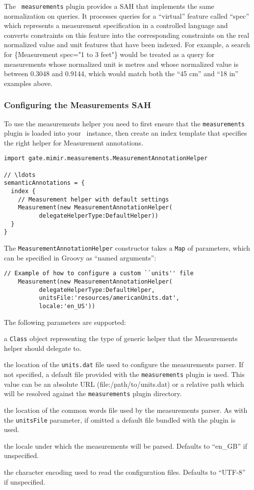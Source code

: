 The \Mimir\ {\tt measurements} plugin provides a SAH that implements the same
normalization on queries.  It processes queries for a ``virtual'' feature
called ``spec'' which represents a measurement specification in a controlled
language and converts constraints on this feature into the corresponding
constraints on the real normalized value and unit features that have been
indexed.  For example, a search for \{Measurement spec="1 to 3 feet"\} would be
treated as a query for measurements whose normalized unit is metres and whose
normalized value is between 0.3048 and 0.9144, which would match both the ``45
cm'' and ``18 in'' examples above.

\subsubsection{Configuring the Measurements SAH}

To use the measurements helper you need to first ensure that the
{\tt measurements} plugin is loaded into your \Mimir\ instance, then create an
index template that specifies the right helper for Measurement annotations.
\begin{lstlisting}[texcl]
import gate.mimir.measurements.MeasurementAnnotationHelper

// \ldots
semanticAnnotations = {
  index {
    // Measurement helper with default settings
    Measurement(new MeasurementAnnotationHelper(
          delegateHelperType:DefaultHelper))
  }
}
\end{lstlisting}

The {\tt MeasurementAnnotationHelper} constructor takes a {\tt Map} of
parameters, which can be specified in Groovy as ``named arguments'':
\begin{lstlisting}[firstnumber=6,texcl]
    // Example of how to configure a custom ``units'' file
    Measurement(new MeasurementAnnotationHelper(
          delegateHelperType:DefaultHelper,
          unitsFile:'resources/americanUnits.dat',
          locale:'en_US'))
\end{lstlisting}

The following parameters are supported:
\bde
\item[delegateHelperType (required)] a {\tt Class} object representing the type
of generic helper that the Measurements helper should delegate to.
\item[unitsFile] the location of the {\tt units.dat} file used to configure the
  measurements parser.  If not specified, a default file provided with the
  {\tt measurements} plugin is used.  This value can be an absolute URL
  (file:/path/to/units.dat) or a relative path which will be resolved against
  the {\tt measurements} plugin directory.
\item[commonWords] the location of the common words file used by the
  measurements parser.  As with the {\tt unitsFile} parameter, if omitted a
  default file bundled with the plugin is used.
\item[locale] the locale under which the measurements will be parsed.  Defaults
  to ``en\_GB'' if unspecified.
\item[encoding] the character encoding used to read the configuration files.
  Defaults to ``UTF-8'' if unspecified.
\ede


